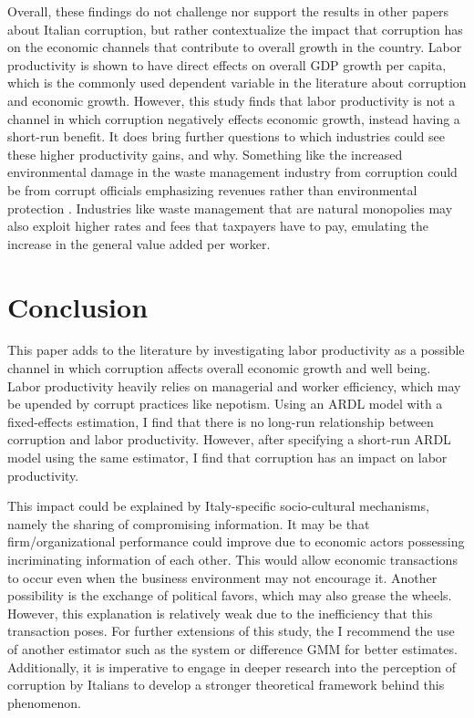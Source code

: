 \documentclass[12pt]{article} %
\begin{document}
Overall, these findings do not challenge nor support the results in other papers about Italian corruption, but rather contextualize the impact that corruption has on the economic channels that contribute to overall growth in the country. Labor productivity is shown to have direct effects on overall GDP growth per capita, which is the commonly used dependent variable in the literature about corruption and economic growth. However, this study finds that labor productivity is not a channel in which corruption negatively effects economic growth, instead having a short-run benefit. It does bring further questions to which industries could see these higher productivity gains, and why. Something like the increased environmental damage in the waste management industry from corruption could be from corrupt officials emphasizing revenues rather than environmental protection \citep{romano_environmental_2021}. Industries like waste management that are natural monopolies may also exploit higher rates and fees that taxpayers have to pay, emulating the increase in the general value added per worker. 



\section*{Conclusion}


This paper adds to the literature by investigating labor productivity as a possible channel in which corruption affects overall economic growth and well being.  Labor productivity heavily relies on managerial and worker efficiency, which may be upended by corrupt practices like nepotism. Using an ARDL model with a fixed-effects estimation, I find that there is no long-run relationship between corruption and labor productivity. However, after specifying a short-run ARDL model using the same estimator, I find that corruption has an impact on labor productivity.

This impact could be explained by Italy-specific socio-cultural mechanisms, namely the sharing of compromising information. It may be that firm/organizational performance could improve due to economic actors possessing incriminating information of each other. This would allow economic transactions to occur even when the business environment may not encourage it. Another possibility is the exchange of political favors, which may also grease the wheels. However, this explanation is relatively weak due to the inefficiency that this transaction poses. For further extensions of this study, the I recommend the use of another estimator such as the system or difference GMM for better estimates. Additionally, it is imperative to engage in deeper research into the perception of corruption by Italians to develop a stronger theoretical framework behind this phenomenon.
\end{document}
